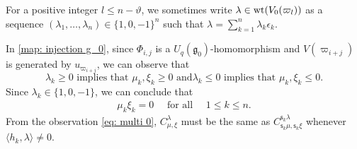 \documentclass[11pt, leqno]{amsart}
\theoremstyle{definition}
\numberwithin{equation}{section}
\begin{document}
For a positive integer $l \le n -\vartheta$, we sometimes write
$\lambda \in {\rm wt}(V_0({\varpi}_{l})) $ as a sequence $(\lambda_1,
\ldots, \lambda_n) \in \{ 1,0,-1 \}^{n}$ such that
$\lambda=\sum_{k=1}^{n} \lambda_k \epsilon_k$.

In \eqref{map: injection g_0}, since $\Phi_{i,j}$ is a $U_q({\mathfrak g}_0)$-homomorphism and $V({\varpi}_{i+j})$ is generated by
$u_{{\varpi}_{i+j}}$, we can observe that
\begin{equation} \label{eq: multi 0}
\text{$\lambda_k \ge 0$ implies that $\mu_k, \xi_k \ge 0$ and
$\lambda_k \le 0$ implies that $\mu_k, \xi_k \le 0$.}
\end{equation}
Since $\lambda_k \in \{ 1,0,-1\}$, we can conclude that
\begin{align} \label{eq: mu_k xi_k=0}
\mu_k \xi_k=0 \quad \text{ for all } \quad 1 \le k \le n.
\end{align}
From the observation \eqref{eq: multi 0},  $C_{\mu,\xi}^{\lambda}$ must be the same as $C_{{\mathsf{s}}_k\mu,{\mathsf{s}}_k\xi}^{{\mathsf{s}}_k\lambda}$ whenever
$\langle h_k ,\lambda \rangle \neq 0$.
\end{document}
